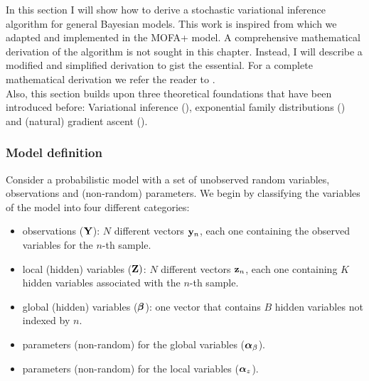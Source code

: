 In this section I will show how to derive a stochastic variational inference algorithm for general Bayesian models. This work is inspired from \cite{Hoffman2012} which we adapted and implemented in the MOFA+ model. A comprehensive mathematical derivation of the algorithm is not sought in this chapter. Instead, I will describe a modified and simplified derivation to gist the essential. For a complete mathematical derivation we refer the reader to \cite{Hoffman2012}.\\
Also, this section builds upon three theoretical foundations that have been introduced before: Variational inference (), exponential family distributions () and (natural) gradient ascent ().






\subsubsection{Model definition}

Consider a probabilistic model with a set of unobserved random variables, observations and (non-random) parameters. We begin by classifying the variables of the model into four different categories:

\begin{itemize}
	\item observations (${\bf Y}$): $N$ different vectors ${\bf y}_{n}$, each one containing the observed variables for the $n$-th sample.
	\item local (hidden) variables (${\bf Z})$: $N$ different vectors ${\bf z}_{n}$, each one containing $K$ hidden variables associated with the $n$-th sample.
	\item global (hidden) variables ($\mbox{\boldmath $\beta$}$): one vector that contains $B$ hidden variables not indexed by $n$.
	\item parameters (non-random) for the global variables ($\mbox{\boldmath $\alpha$}_{\beta}$).
	\item parameters (non-random) for the local variables ($\mbox{\boldmath $\alpha$}_{z}$).
\end{itemize}

